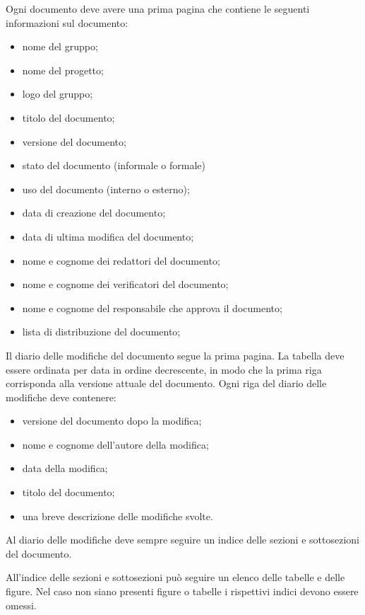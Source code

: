 \documentclass[12pt,a4paper]{article}
\begin{document}
Ogni documento deve avere una prima pagina che contiene le seguenti informazioni sul documento:
\begin{itemize}
  \item nome del gruppo;
  \item nome del progetto;
  \item logo del gruppo;
  \item titolo del documento;
  \item versione del documento;
  \item stato del documento (informale o formale)
  \item uso del documento (interno o esterno);
  \item data di creazione del documento;
  \item data di ultima modifica del documento;
  \item nome e cognome dei redattori del documento;
  \item nome e cognome dei verificatori del documento;
  \item nome e cognome del responsabile che approva il documento;
  \item lista di distribuzione del documento;     
\end{itemize}

Il diario delle modifiche del documento segue la prima pagina. La tabella deve essere ordinata per data in ordine decrescente, in modo che la prima riga corrisponda alla versione attuale del documento. Ogni riga del diario delle modifiche deve contenere:
\begin{itemize}
  \item versione del documento dopo la modifica;
  \item nome e cognome dell'autore della modifica;
  \item data della modifica;
  \item titolo del documento;
  \item una breve descrizione delle modifiche svolte.
\end{itemize}

Al diario delle modifiche deve sempre seguire un indice delle sezioni e sottosezioni del documento.

All'indice delle sezioni e sottosezioni può seguire un elenco delle tabelle e delle figure. Nel caso non siano presenti figure o tabelle i rispettivi indici devono essere omessi.
\end{document}
